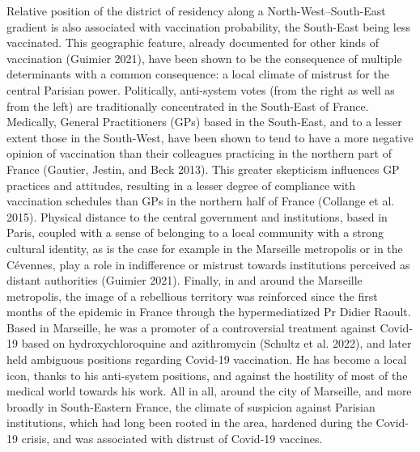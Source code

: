 \documentclass[
]{article}
\begin{document}
Relative position of the district of residency along a North-West--South-East gradient is also associated with vaccination probability, the South-East being less vaccinated. This geographic feature, already documented for other kinds of vaccination (Guimier 2021), have been shown to be the consequence of multiple determinants with a common consequence: a local climate of mistrust for the central Parisian power. Politically, anti-system votes (from the right as well as from the left) are traditionally concentrated in the South-East of France. Medically, General Practitioners (GPs) based in the South-East, and to a lesser extent those in the South-West, have been shown to tend to have a more negative opinion of vaccination than their colleagues practicing in the northern part of France (Gautier, Jestin, and Beck 2013). This greater skepticism influences GP practices and attitudes, resulting in a lesser degree of compliance with vaccination schedules than GPs in the northern half of France (Collange et al. 2015). Physical distance to the central government and institutions, based in Paris, coupled with a sense of belonging to a local community with a strong cultural identity, as is the case for example in the Marseille metropolis or in the Cévennes, play a role in indifference or mistrust towards institutions perceived as distant authorities (Guimier 2021). Finally, in and around the Marseille metropolis, the image of a rebellious territory was reinforced since the first months of the epidemic in France through the hypermediatized Pr Didier Raoult. Based in Marseille, he was a promoter of a controversial treatment against Covid-19 based on hydroxychloroquine and azithromycin (Schultz et al. 2022), and later held ambiguous positions regarding Covid-19 vaccination. He has become a local icon, thanks to his anti-system positions, and against the hostility of most of the medical world towards his work. All in all, around the city of Marseille, and more broadly in South-Eastern France, the climate of suspicion against Parisian institutions, which had long been rooted in the area, hardened during the Covid-19 crisis, and was associated with distrust of Covid-19 vaccines.
\end{document}
